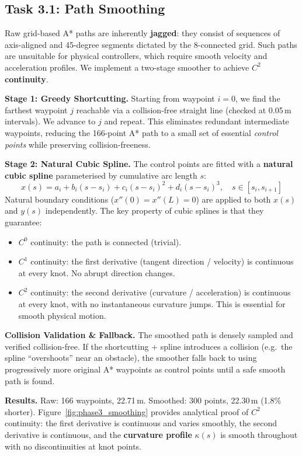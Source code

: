 \documentclass[11pt,a4paper]{article}
\begin{document}
\subsection{Task 3.1: Path Smoothing}

Raw grid-based A* paths are inherently \textbf{jagged}: they consist of sequences of axis-aligned and 45-degree segments dictated by the 8-connected grid. Such paths are unsuitable for physical controllers, which require smooth velocity and acceleration profiles. We implement a two-stage smoother to achieve \textbf{$C^2$ continuity}.

\textbf{Stage 1: Greedy Shortcutting.}
Starting from waypoint $i = 0$, we find the farthest waypoint $j$ reachable via a collision-free straight line (checked at 0.05\,m intervals). We advance to $j$ and repeat. This eliminates redundant intermediate waypoints, reducing the 166-point A* path to a small set of essential \emph{control points} while preserving collision-freeness.

\textbf{Stage 2: Natural Cubic Spline.}
The control points are fitted with a \textbf{natural cubic spline} parameterised by cumulative arc length $s$:
\[
    x(s) = a_i + b_i(s - s_i) + c_i(s - s_i)^2 + d_i(s - s_i)^3, \quad s \in [s_i, s_{i+1}]
\]
Natural boundary conditions ($x''(0) = x''(L) = 0$) are applied to both $x(s)$ and $y(s)$ independently. The key property of cubic splines is that they guarantee:
\begin{itemize}[nosep]
    \item $C^0$ continuity: the path is connected (trivial).
    \item $C^1$ continuity: the first derivative (tangent direction / velocity) is continuous at every knot. No abrupt direction changes.
    \item $C^2$ continuity: the second derivative (curvature / acceleration) is continuous at every knot, with no instantaneous curvature jumps. This is essential for smooth physical motion.
\end{itemize}

\textbf{Collision Validation \& Fallback.}
The smoothed path is densely sampled and verified collision-free. If the shortcutting + spline introduces a collision (e.g.\ the spline ``overshoots'' near an obstacle), the smoother falls back to using progressively more original A* waypoints as control points until a safe smooth path is found.

\textbf{Results.} Raw: 166 waypoints, 22.71\,m. Smoothed: 300 points, 22.30\,m (1.8\% shorter). Figure~\ref{fig:phase3_smoothing} provides analytical proof of $C^2$ continuity: the first derivative is continuous and varies smoothly, the second derivative is continuous, and the \textbf{curvature profile} $\kappa(s)$ is smooth throughout with no discontinuities at knot points.
\end{document}

